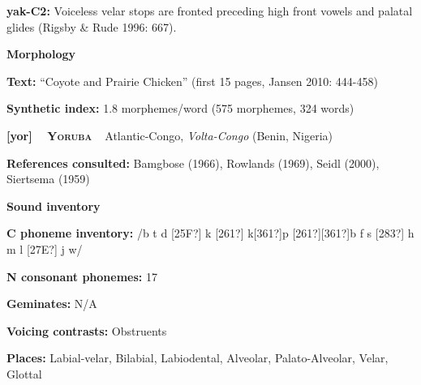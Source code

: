 \begin{styleBody}
\textbf{yak-C2: }Voiceless velar stops are fronted preceding high front vowels and palatal glides (Rigsby \& Rude 1996: 667).
\end{styleBody}

\begin{styleBody}
\textbf{Morphology}
\end{styleBody}

\begin{styleBody}
\textbf{Text:} “Coyote and Prairie Chicken” (first 15 pages, Jansen 2010: 444-458)
\end{styleBody}

\begin{styleBody}
\textbf{Synthetic index: }1.8 morphemes/word (575 morphemes, 324 words)
\end{styleBody}

\clearpage\begin{styleBody}
\textbf{[yor] }\ \ \textbf{\textsc{Yoruba}}\textbf{\ \ }Atlantic-Congo, \textit{Volta-Congo} (Benin, Nigeria)
\end{styleBody}

\begin{styleBody}
\textbf{References consulted: }Bamgbose (1966), Rowlands (1969), Seidl (2000), Siertsema (1959)
\end{styleBody}

\begin{styleBody}
\textbf{Sound inventory}
\end{styleBody}

\begin{styleBody}
\textbf{C phoneme inventory:} /b t d [25F?] k [261?] k[361?]p [261?][361?]b f s [283?] h m l [27E?] j w/
\end{styleBody}

\begin{styleBody}
\textbf{N consonant phonemes:} 17
\end{styleBody}

\begin{styleBody}
\textbf{Geminates:} N/A
\end{styleBody}

\begin{styleBody}
\textbf{Voicing contrasts:} Obstruents
\end{styleBody}

\begin{styleBody}
\textbf{Places:} Labial-velar, Bilabial, Labiodental, Alveolar, Palato-Alveolar, Velar, Glottal
\end{styleBody}

